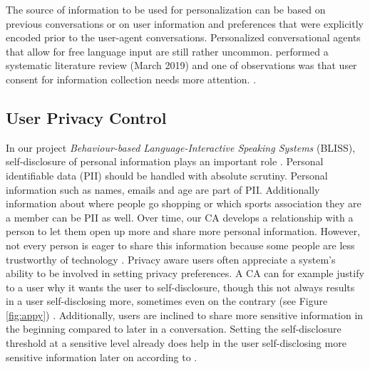 \documentclass[sigchi-a,nonacm]{acmart}
\begin{document}
The source of information to be used for personalization can be based on previous conversations or on user information and preferences that were explicitly encoded prior to the user-agent conversations. %
Personalized conversational agents that allow for free language input are still rather uncommon. \citeauthor{Montenegro2019surveyagents} performed a systematic literature review (March 2019) and one of observations was that user consent for information collection needs more attention. \cite{Montenegro2019surveyagents}. %


\subsection{User Privacy Control}
In our project \emph{Behaviour-based Language-Interactive Speaking Systems} (BLISS), self-disclosure of personal information plays an important role \cite{vanwaterschoot2020BLISS}. Personal identifiable data (PII) should be handled with absolute scrutiny. Personal information such as names, emails and age are part of PII. Additionally information about where people go shopping or which sports association they are a member can be PII as well. Over time, our CA develops a relationship with a person to let them open up more and share more personal information. However, not every person is eager to share this information because some people are less trustworthy of technology \cite{rapp2016PersonalInformaticsEveryday}. Privacy aware users often appreciate a system's ability to be involved in setting privacy preferences. A CA can for example justify to a user why it wants the user to self-disclosure, though this not always results in a user self-disclosing more, sometimes even on the contrary (see Figure \ref{fig:appy}) \cite{knijnenburg2013HelpingUsersInformation}. Additionally, users are inclined to share more sensitive information in the beginning compared to later in a conversation. Setting the self-disclosure threshold at a sensitive level already does help in the user self-disclosing more sensitive information later on according to \cite{knijnenburg2013making}.
\end{document}
